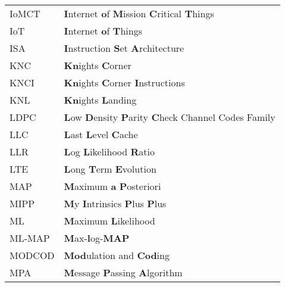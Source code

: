 \begin{center}
\begin{longtable}{ p{}  p{} }
IoMCT       & \textbf{I}nternet \textbf{o}f \textbf{M}ission \textbf{C}ritical \textbf{T}hings                                \\
IoT         & \textbf{I}nternet \textbf{o}f \textbf{T}hings                                                                   \\
ISA         & \textbf{I}nstruction \textbf{S}et \textbf{A}rchitecture                                                         \\
KNC         & \textbf{Kn}ights \textbf{C}orner                                                                                \\
KNCI        & \textbf{Kn}ights \textbf{C}orner \textbf{I}nstructions                                                          \\
KNL         & \textbf{Kn}ights \textbf{L}anding                                                                               \\
LDPC        & \textbf{L}ow \textbf{D}ensity \textbf{P}arity \textbf{C}heck Channel Codes Family                               \\
LLC         & \textbf{L}ast \textbf{L}evel \textbf{C}ache                                                                     \\
LLR         & \textbf{L}og \textbf{L}ikelihood \textbf{R}atio                                                                 \\
LTE         & \textbf{L}ong \textbf{T}erm \textbf{E}volution                                                                  \\
MAP         & \textbf{M}aximum \textbf{a} \textbf{P}osteriori                                                                 \\
MIPP        & \textbf{M}y \textbf{I}ntrinsics \textbf{P}lus \textbf{P}lus                                                     \\
ML          & \textbf{M}aximum \textbf{L}ikelihood                                                                            \\
ML-MAP      & \textbf{M}ax-\textbf{l}og-\textbf{MAP}                                                                          \\
MODCOD      & \textbf{Mod}ulation and \textbf{Cod}ing                                                                         \\
MPA         & \textbf{M}essage \textbf{P}assing \textbf{A}lgorithm                                                            \\

\end{longtable}
\end{center}
